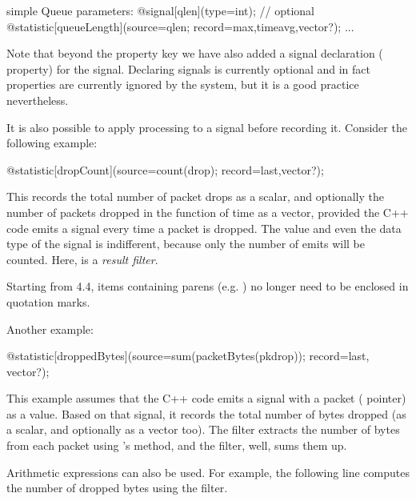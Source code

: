 \begin{ned}
simple Queue
{
    parameters:
        @signal[qlen](type=int); // optional
        @statistic[queueLength](source=qlen; record=max,timeavg,vector?);
        ...
}
\end{ned}

Note that beyond the  property key we have also added
a signal declaration ( property) for the  signal.
Declaring signals is currently optional and in fact  properties
are currently ignored by the system, but it is a good practice nevertheless.

It is also possible to apply processing to a signal before recording it.
Consider the following example:

\begin{ned}
@statistic[dropCount](source=count(drop); record=last,vector?);
\end{ned}

This records the total number of packet drops as a scalar, and
optionally the number of packets dropped in the function of time as a
vector, provided the C++ code emits a  signal every time a packet
is dropped. The value and even the data type of the  signal is
indifferent, because only the number of emits will be counted.
Here,  is a \textit{result filter}.

\begin{note}
Starting from {\opp} 4.4, items containing parens (e.g. )
no longer need to be enclosed in quotation marks.
\end{note}

Another example:

\begin{ned}
@statistic[droppedBytes](source=sum(packetBytes(pkdrop)); record=last,
vector?);
\end{ned}

This example assumes that the C++ code emits a  signal with a
packet ( pointer) as a value. Based on that signal, it
records the total number of bytes dropped (as a scalar, and optionally as a
vector too). The  filter extracts the number of bytes
from each packet using 's  method,
and the  filter, well, sums them up.

Arithmetic expressions can also be used. For example, the following line
computes the number of dropped bytes using the  filter.

